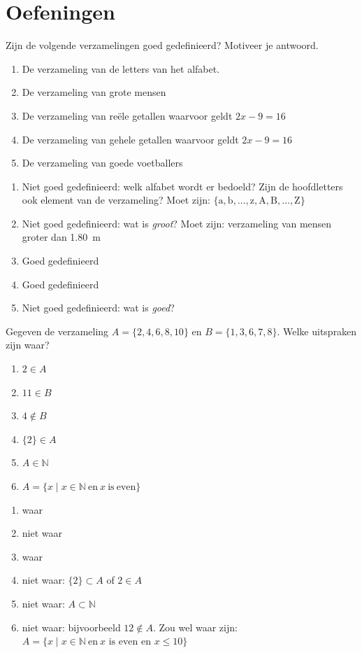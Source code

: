 \section{Oefeningen}
\begin{oef}
Zijn de volgende verzamelingen goed gedefinieerd? Motiveer je antwoord.
\begin{enumerate}
\item De verzameling van de letters van het alfabet.
\item De verzameling van grote mensen
\item De verzameling van re\"ele getallen waarvoor geldt $2x-9=16$
\item De verzameling van gehele getallen waarvoor geldt $2x-9=16$
\item De verzameling van goede voetballers
\end{enumerate}
\begin{opl}
\begin{enumerate}
\item Niet goed gedefinieerd: welk alfabet wordt er bedoeld? Zijn de hoofdletters ook element van de verzameling? Moet zijn: $\{\text{a},\text{b},\dots,\text{z},\text{A},\text{B},\dots,\text{Z}\}$
\item Niet goed gedefinieerd: wat is \emph{groot}? Moet zijn: verzameling van mensen groter dan \SI{1.80}{\meter}
\item Goed gedefinieerd
\item Goed gedefinieerd
\item Niet goed gedefinieerd: wat is \emph{goed}?
\end{enumerate}
\end{opl}
\end{oef}



\begin{oef}
Gegeven de verzameling $A=\{2,4,6,8,10\}$ en $B=\{1,3,6,7,8\}$. Welke uitspraken zijn waar? 
\begin{enumerate}
\item $2\in A$
\item $11\in B$
\item $4 \not \in B$
\item $\{2\}\in A$
\item $A\in \mathbb{N}$
\item $A=\{x\mid x\in \mathbb{N} \mathrm{~en~}x\mathrm{~is~even}\}$
\end{enumerate}
\begin{opl}
\begin{enumerate}
\item waar
\item niet waar
\item waar
\item niet waar: $\{2\}\subset A$ of $2\in A$
\item niet waar: $A\subset \mathbb{N}$
\item niet waar: bijvoorbeeld $12\not \in A$. Zou wel waar zijn: $A=\{x\mid x\in \mathbb{N} \mathrm{~en~}x\text{~is~even en }x\leqslant 10\}$
\end{enumerate}
\end{opl}
\end{oef}




